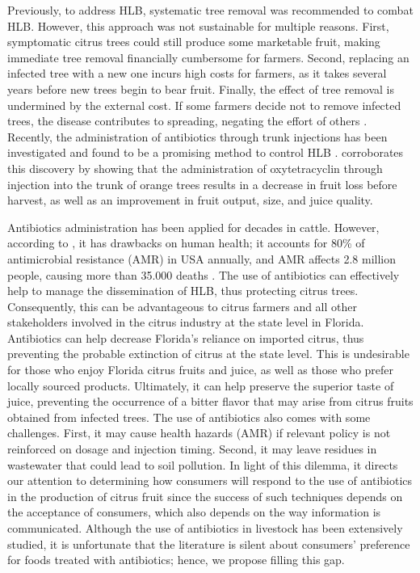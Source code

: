 \documentclass[12pt]{article}
\begin{document}
Previously, to address HLB, systematic tree removal was recommended to combat HLB. However, this approach was not sustainable for multiple reasons. First, symptomatic citrus trees could still produce some marketable fruit, making immediate tree removal financially cumbersome for farmers. Second, replacing an infected tree with a new one incurs high costs for farmers, as it takes several years before new trees begin to bear fruit.  Finally, the effect of tree removal is undermined by the external cost. If some farmers decide not to remove infected trees, the disease contributes to spreading, negating the effort of others \citep{farnsworth_potential_2024}. Recently, the administration of antibiotics through trunk injections has been investigated and found to be a promising method to control HLB \citep{li_precision_2022}. \citet{archer_trunk_2023} corroborates this discovery by showing that the administration of oxytetracyclin through injection into the trunk of orange trees results in a decrease in fruit loss before harvest, as well as an improvement in fruit output, size, and juice quality.

Antibiotics administration has been applied for decades in cattle. However, according to \citet{hosain_antimicrobial_2021}, it has drawbacks on human health; it accounts for 80\% of antimicrobial resistance (AMR) in USA annually, and AMR affects 2.8 million people, causing more than 35.000 deaths \citep{cdc2019antibiotic}.  The use of antibiotics can effectively help to manage the dissemination of HLB, thus protecting citrus trees. Consequently, this can be advantageous to citrus farmers and all other stakeholders involved in the citrus industry at the state level in Florida. Antibiotics can help decrease Florida's reliance on imported citrus, thus preventing the probable extinction of citrus at the state level. This is undesirable for those who enjoy Florida citrus fruits and juice, as well as those who prefer locally sourced products. Ultimately, it can help preserve the superior taste of juice, preventing the occurrence of a bitter flavor that may arise from citrus fruits obtained from infected trees. The use of antibiotics also comes with some challenges. First, it may cause health hazards (AMR) if relevant policy is not reinforced on dosage and injection timing. Second, it may leave  residues in wastewater that could lead to soil pollution. In light of this dilemma, it directs our attention to determining how consumers will respond to the use of antibiotics in the production of citrus fruit since the success of such techniques depends on the acceptance of consumers, which also depends on the way information is communicated. Although the use of antibiotics in livestock has been extensively studied, it is unfortunate that the literature is silent about consumers’ preference for foods treated with antibiotics; hence, we propose filling this gap.
\end{document}
